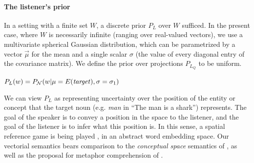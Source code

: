\documentclass[9pt,twocolumn,twoside,lineno]{pnas-new}
\begin{document}




		
	







	\paragraph{The listener's prior} 

		In a setting with a finite set $W$, a discrete prior $P_L$ over $W$ sufficed. In the present case, where $W$ is necessarily infinite (ranging over real-valued vectors), we use a multivariate spherical Gaussian distribution, which can be parametrized by a vector $\overrightarrow{\mu}$ for the mean and a single scalar $\sigma$ (the value of every diagonal entry of the covariance matrix). We define the prior over projections $P_{L_Q}$ to be uniform.

		\begin{examples}
		
		\item $P_L(w) = P_{\mathcal{N}}(w\vert\mu=E(\textrm{\emph{target}}),\sigma=\sigma_1)$ \label{vect:prior}
		\end{examples}

		We can view $P_L$ as representing uncertainty over the position of the entity or concept that the target noun (e.g. \emph{man} in ``The man is a shark'') represents.
		The goal of the speaker is to convey a position in the space 
		to the listener, and the goal of the listener is to infer what this position is. In this sense, a spatial reference game is being played  \cite{golland2010game}, in an abstract word embedding space. Our vectorial semantics bears comparison to the \emph{conceptual space} semantics of \cite{gardenfors2004conceptual}, as well as the proposal for metaphor comprehension of \cite{kintsch2000metaphor}.
\end{document}
